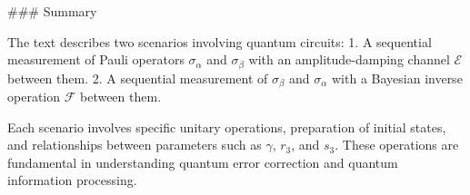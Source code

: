 ### Summary

The text describes two scenarios involving quantum circuits:
1. A sequential measurement of Pauli operators \(\sigma_\alpha\) and \(\sigma_\beta\) with an amplitude-damping channel \(\mathcal{E}\) between them.
2. A sequential measurement of \(\sigma_\beta\) and \(\sigma_\alpha\) with a Bayesian inverse operation \(\mathcal{F}\) between them.

Each scenario involves specific unitary operations, preparation of initial states, and relationships between parameters such as \(\gamma\), \(r_3\), and \(s_3\). These operations are fundamental in understanding quantum error correction and quantum information processing.